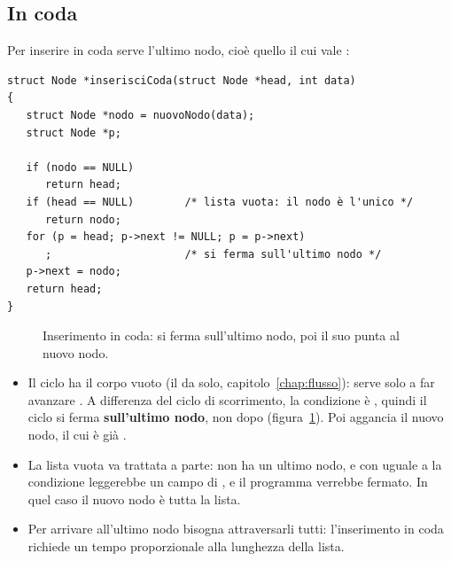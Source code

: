 \subsection{In coda}

Per inserire in coda serve l'ultimo nodo, cioè quello il cui 
vale :

\begin{lstlisting}[style=c, name=lista.c]
struct Node *inserisciCoda(struct Node *head, int data)
{
   struct Node *nodo = nuovoNodo(data);
   struct Node *p;

   if (nodo == NULL)
      return head;
   if (head == NULL)        /* lista vuota: il nodo è l'unico */
      return nodo;
   for (p = head; p->next != NULL; p = p->next)
      ;                     /* si ferma sull'ultimo nodo */
   p->next = nodo;
   return head;
}
\end{lstlisting}

\begin{figure}[H]
  \centering
  \caption{Inserimento in coda:  si ferma sull'ultimo nodo, poi il
           suo  punta al nuovo nodo.}
  \label{fig:ins-coda}
\end{figure}

\begin{itemize}
  \item Il ciclo ha il corpo vuoto (il \code{;} da solo,
        capitolo~\ref{chap:flusso}): serve solo a far avanzare . A
        differenza del ciclo di scorrimento, la condizione è
        , quindi il ciclo si ferma \textbf{sull'ultimo
        nodo}, non dopo (figura~\ref{fig:ins-coda}). Poi 
        aggancia il nuovo nodo, il cui  è già .
  \item La lista vuota va trattata a parte: non ha un ultimo nodo, e con
         uguale a  la condizione 
        leggerebbe un campo di , e il programma verrebbe fermato.
        In quel caso il nuovo nodo è tutta la lista.
  \item Per arrivare all'ultimo nodo bisogna attraversarli tutti:
        l'inserimento in coda richiede un tempo proporzionale alla lunghezza
        della lista.
\end{itemize}

